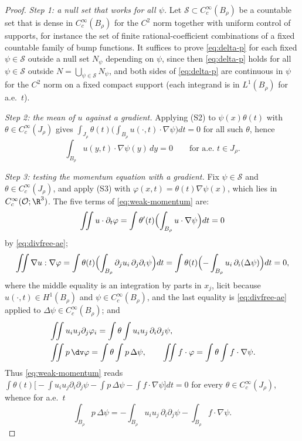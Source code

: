 \documentclass[11pt,reqno]{amsart}
\begin{document}
\begin{proof}
\emph{Step 1: a null set that works for all $\psi$.} Let
$\mathcal{S}\subset C_{c}^{\infty}(B_{\rho})$ be a countable set that is dense in
$C_{c}^{\infty}(B_{\rho})$ for the $C^{2}$ norm together with uniform control of
supports, for instance the set of finite rational-coefficient combinations of a
fixed countable family of bump functions. It suffices to prove
\eqref{eq:delta-p} for each fixed $\psi\in\mathcal{S}$ outside a null set
$N_{\psi}$ depending on $\psi$, since then \eqref{eq:delta-p} holds for all
$\psi\in\mathcal{S}$ outside $N=\bigcup_{\psi\in\mathcal{S}}N_{\psi}$, and both
sides of \eqref{eq:delta-p} are continuous in $\psi$ for the $C^{2}$ norm on a
fixed compact support (each integrand is in $L^{1}(B_{\rho})$ for a.e.\ $t$).

\emph{Step 2: the mean of $u$ against a gradient.} Applying (S2) to
$\psi(x)\theta(t)$ with $\theta\in C_{c}^{\infty}(J_{\rho})$ gives
$\int_{J_{\rho}}\theta(t)\bigl(\int_{B_{\rho}}u(\cdot,t)\cdot\nabla\psi\bigr)dt=0$
for all such $\theta$, hence
\begin{equation}\label{eq:divfree-ae}
  \int_{B_{\rho}}u(y,t)\cdot\nabla\psi(y)\,dy=0
  \qquad\text{for a.e.\ }t\in J_{\rho} .
\end{equation}

\emph{Step 3: testing the momentum equation with a gradient.} Fix
$\psi\in\mathcal{S}$ and $\theta\in C_{c}^{\infty}(J_{\rho})$, and apply (S3)
with $\varphi(x,t)=\theta(t)\nabla\psi(x)$, which lies in
$C_{c}^{\infty}(\mathcal{O};\R^{3})$. The five terms of
\eqref{eq:weak-momentum} are:
\[
  \iint u\cdot\partial_{t}\varphi
  =\int\theta'(t)\Bigl(\int_{B_{\rho}}u\cdot\nabla\psi\Bigr)dt=0
\]
by \eqref{eq:divfree-ae};
\[
  \iint\nabla u:\nabla\varphi
  =\int\theta(t)\Bigl(\int_{B_{\rho}}\partial_{j}u_{i}\,\partial_{j}\partial_{i}\psi\Bigr)dt
  =\int\theta(t)\Bigl(-\int_{B_{\rho}}u_{i}\,\partial_{i}(\Delta\psi)\Bigr)dt=0 ,
\]
where the middle equality is an integration by parts in $x_{j}$, licit because
$u(\cdot,t)\in H^{1}(B_{\rho})$ and $\psi\in C_{c}^{\infty}(B_{\rho})$, and the
last equality is \eqref{eq:divfree-ae} applied to $\Delta\psi\in
C_{c}^{\infty}(B_{\rho})$; and
\[
\begin{aligned}
  &\iint u_{i}u_{j}\partial_{j}\varphi_{i}
   =\int\theta\int u_{i}u_{j}\,\partial_{i}\partial_{j}\psi,\\
  &\iint p\,\dv\varphi=\int\theta\int p\,\Delta\psi,
  \qquad
  \iint f\cdot\varphi=\int\theta\int f\cdot\nabla\psi .
\end{aligned}
\]
Thus \eqref{eq:weak-momentum} reads
$\int\theta(t)\bigl[-\int u_{i}u_{j}\partial_{i}\partial_{j}\psi
 -\int p\,\Delta\psi-\int f\cdot\nabla\psi\bigr]dt=0$ for every
$\theta\in C_{c}^{\infty}(J_{\rho})$, whence for a.e.\ $t$
\begin{equation}\label{eq:delta-p-raw}
  \int_{B_{\rho}}p\,\Delta\psi
  =-\int_{B_{\rho}}u_{i}u_{j}\,\partial_{i}\partial_{j}\psi
   -\int_{B_{\rho}}f\cdot\nabla\psi .
\end{equation}


\end{proof}
\end{document}
